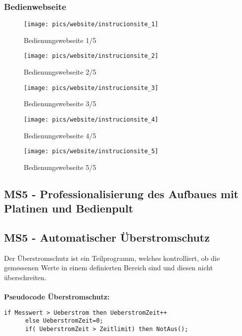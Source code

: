 \documentclass[12pt,a4paper]{article}
\begin{document}
\subsubsection*{Bedienwebseite}
\begin{figure}[h!]
\centering
\texttt{[image: pics/website/instrucionsite\_1]}
\caption{Bedienungswebseite 1/5}
\end{figure}
%
\begin{figure}[h!]
\centering
\texttt{[image: pics/website/instrucionsite\_2]}
\caption{Bedienungswebseite 2/5}
\end{figure}
%
%
\newpage
\begin{figure}[h!]
\centering
\texttt{[image: pics/website/instrucionsite\_3]}
\caption{Bedienungswebseite 3/5}
\end{figure}
%
\begin{figure}[h!]
\centering
\texttt{[image: pics/website/instrucionsite\_4]}
\caption{Bedienungswebseite 4/5}
\end{figure}
%
%
\newpage
\begin{figure}[h!]
\centering
\texttt{[image: pics/website/instrucionsite\_5]}
\caption{Bedienungswebseite 5/5}
\end{figure}
%
%
\newpage
\subsection{MS5 - Professionalisierung des Aufbaues mit Platinen und Bedienpult }
\subsection{MS5 - Automatischer Überstromschutz}
Der Überstromschutz ist ein Teilprogramm, welches kontrolliert, ob die gemessenen Werte in einem definierten Bereich sind und diesen nicht überschreiten. \\\\
{\bf Pseudocode Überstromschutz:}
\begin{lstlisting}[frame=single]
if Messwert > Ueberstrom then UeberstromZeit++
      else UeberstromZeit=0;
      if( UeberstromZeit > Zeitlimit) then NotAus();
\end{lstlisting}
%
%
\newpage
\end{document}
